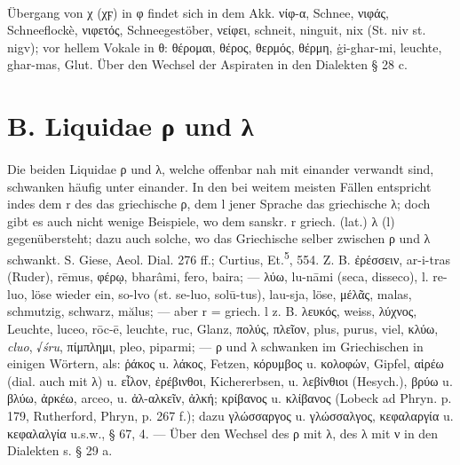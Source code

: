 \paragraph{} Übergang von χ (χϝ) in φ findet sich in dem Akk. νίφ-α, Schnee,
νιφάς, Schneeflockè, νιφετός, Schneegestöber, νείφει, schneit,  ninguit, nix
(St. niv st. nigv); vor hellem Vokale in θ: θέρομαι, θέρος, θερμός, θέρμη, 
ġi-ghar-mi, leuchte, ghar-mas, Glut. Über den Wechsel der Aspiraten in den
Dialekten § 28 c.

\section{B. Liquidae ρ und λ}

\paragraph{} Die beiden Liquidae ρ und λ, welche offenbar nah mit einander
verwandt sind, schwanken häufig unter einander. In den bei weitem meisten Fällen
entspricht indes dem r des  das griechische ρ, dem l jener Sprache das
griechische λ; doch gibt es auch nicht wenige Beispiele, wo dem sanskr. r
griech. (lat.) λ (l) gegenübersteht; dazu auch solche, wo das Griechische selber
zwischen ρ und λ schwankt. S. Giese, Aeol. Dial. 276 ff.; Curtius,
Et.\textsuperscript{5}, 554. Z. B. ἐρέσσειν,  ar-i-tras (Ruder),  rēmus,
φέρῳ,  bharâmi,  fero,  baira; — λύω,  lu-nāmi (seca, disseco), l.
re-luo, löse wieder ein, so-lvo (st. se-luo, solū-tus),  lau-sja, löse,
μέλᾶς,  malas, schmutzig, schwarz,  mălus; — aber  r = griech. l z. B.
λευκός, weiss, λύχνος, Leuchte,  luceo,  rōc-ē, leuchte, ruc,
Glanz, πολύς, πλεῖον,  plus,  purus,
viel, κλύω,  \emph{cluo},  √\emph{śru}, πίμπλημι,  pleo,  piparmi; — ρ und λ schwanken im Griechischen
in einigen Wörtern, als: ῥάκος u. λάκος, Fetzen, κόρυμβος u. κολοφών, Gipfel,
αἱρέω (dial. auch mit λ) u. εἶλον, ἐρέβινθοι, Kichererbsen, u. λεβίνθιοι
(Hesych.), βρύω u. βλύω, ἀρκέω,  arceo, u. ἀλ-αλκεῖν, ἀλκή; κρίβανος u.
κλίβανος (Lobeck ad Phryn. p. 179, Rutherford, Phryn, p. 267 f.); dazu
γλώσσαργος u. γλώσσαλγος, κεφαλαργία u. κεφαλαλγία u.s.w., § 67, 4. — Über den
Wechsel des ρ mit λ, des λ mit ν in den Dialekten s. § 29 a.

